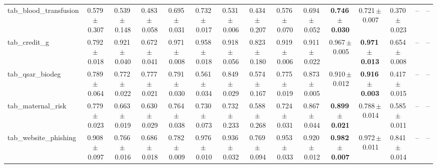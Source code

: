 \documentclass[8pt]{extarticle}
\begin{document}
\begin{longtable}{l*{14}{c}}
tab\_blood\_transfusion & 0.579\,$\pm$\,0.307 & 0.539\,$\pm$\,0.148 & 0.483\,$\pm$\,0.058 & 0.695\,$\pm$\,0.031 & 0.732\,$\pm$\,0.017 & 0.531\,$\pm$\,0.006 & 0.434\,$\pm$\,0.207 & 0.576\,$\pm$\,0.070 & 0.694\,$\pm$\,0.052 & \textbf{0.746\,$\pm$\,0.030} & 0.721\,$\pm$\,0.007 & 0.370\,$\pm$\,0.023 & -- & -- \\
tab\_credit\_g & 0.792\,$\pm$\,0.018 & 0.921\,$\pm$\,0.040 & 0.672\,$\pm$\,0.041 & 0.971\,$\pm$\,0.008 & 0.958\,$\pm$\,0.018 & 0.918\,$\pm$\,0.056 & 0.823\,$\pm$\,0.180 & 0.919\,$\pm$\,0.006 & 0.911\,$\pm$\,0.022 & 0.967\,$\pm$\,0.005 & \textbf{0.971\,$\pm$\,0.013} & 0.654\,$\pm$\,0.008 & -- & -- \\
tab\_qsar\_biodeg & 0.789\,$\pm$\,0.064 & 0.772\,$\pm$\,0.022 & 0.777\,$\pm$\,0.021 & 0.791\,$\pm$\,0.030 & 0.561\,$\pm$\,0.034 & 0.849\,$\pm$\,0.029 & 0.574\,$\pm$\,0.167 & 0.775\,$\pm$\,0.019 & 0.873\,$\pm$\,0.005 & 0.910\,$\pm$\,0.012 & \textbf{0.916\,$\pm$\,0.003} & 0.417\,$\pm$\,0.015 & -- & -- \\
tab\_maternal\_risk & 0.779\,$\pm$\,0.023 & 0.663\,$\pm$\,0.019 & 0.630\,$\pm$\,0.029 & 0.764\,$\pm$\,0.038 & 0.730\,$\pm$\,0.073 & 0.732\,$\pm$\,0.233 & 0.588\,$\pm$\,0.268 & 0.724\,$\pm$\,0.031 & 0.867\,$\pm$\,0.044 & \textbf{0.899\,$\pm$\,0.021} & 0.788\,$\pm$\,0.014 & 0.585\,$\pm$\,0.011 & -- & -- \\
tab\_website\_phishing & 0.908\,$\pm$\,0.097 & 0.766\,$\pm$\,0.016 & 0.686\,$\pm$\,0.018 & 0.782\,$\pm$\,0.009 & 0.976\,$\pm$\,0.010 & 0.936\,$\pm$\,0.032 & 0.769\,$\pm$\,0.094 & 0.953\,$\pm$\,0.033 & 0.920\,$\pm$\,0.012 & \textbf{0.982\,$\pm$\,0.007} & 0.972\,$\pm$\,0.011 & 0.841\,$\pm$\,0.014 & -- & -- \\
\end{longtable}
\end{document}
